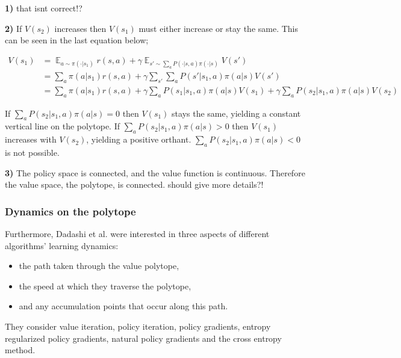 \textbf{1)} {\color{red} that isnt correct!?}

\textbf{2)} If $V(s_2)$ increases then $V(s_1)$ must either increase or stay the same.
This can be seen in the last equation below;

\begin{align*}
V(s_1) &= \mathop{\mathbb E}_{a \sim\pi(\cdot|s_1)} r(s, a) + \gamma \mathop{\mathbb E}_{s'\sim \sum_a P(\cdot|s, a)\pi(\cdot|s)} V(s')\\
&= \sum_a \pi(a|s_1)r(s, a) + \gamma \sum_{s'}\sum_a P(s'|s_1, a)\pi(a|s) V(s') \\
&= \sum_a \pi(a|s_1)r(s, a) + \gamma \sum_a P(s_1|s_1, a)\pi(a|s) V(s_1) + \gamma\sum_a P(s_2|s_1, a)\pi(a|s) V(s_2)
\end{align*}

If $\sum_a P(s_2|s_1, a)\pi(a|s) = 0$ then $V(s_1)$ stays the same, yielding a constant vertical line on the polytope.
If $\sum_a P(s_2|s_1, a)\pi(a|s) > 0$ then $V(s_1)$ increases with $V(s_2)$, yielding a positive orthant.
$\sum_a P(s_2|s_1, a)\pi(a|s) < 0$ is not possible.

\textbf{3)} The policy space is connected, and the value function is continuous.
Therefore the value space, the polytope, is connected. {\color{red}should give more details?!}


\subsubsection{Dynamics on the polytope}

Furthermore, Dadashi et al. \cite{Dadashi2018} were interested in three aspects of different algorithms’ learning dynamics:

\begin{itemize}
\tightlist
  \item the path taken through the value polytope,
  \item the speed at which they traverse the polytope,
  \item and any accumulation points that occur along this path.
\end{itemize}


They consider value iteration, policy iteration, policy gradients, entropy regularized policy gradients,
natural policy gradients and the cross entropy method.

